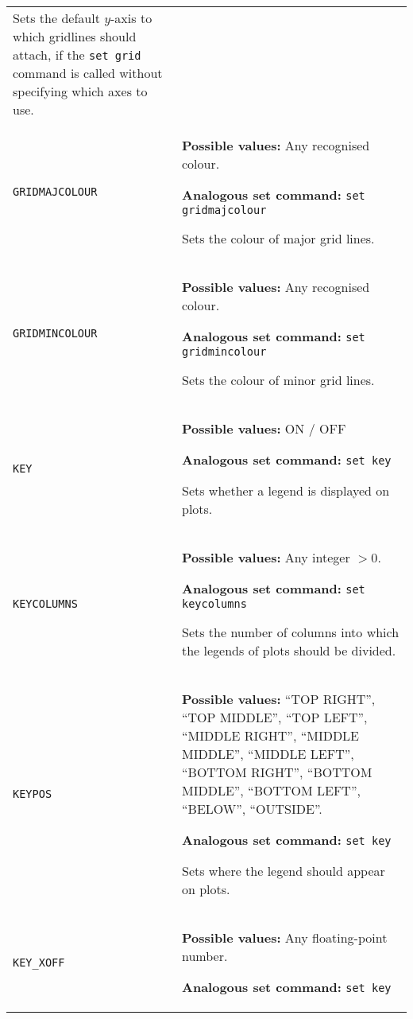 \begin{longtable}{p{3.4cm}p{9cm}}
                   Sets the default $y$-axis to which gridlines should attach, if the {\tt set grid} command is called without specifying which axes to use.
                   \\
{\tt GRIDMAJCOLOUR} & {\bf Possible values:} Any recognised colour.

                   {\bf Analogous set command:} {\tt set gridmajcolour}\index{set gridmajcolour command@{\tt set gridmajcolour} command}

                   Sets the colour of major grid lines.
                   \\
{\tt GRIDMINCOLOUR} & {\bf Possible values:} Any recognised colour.

                   {\bf Analogous set command:} {\tt set gridmincolour}\index{set gridmincolour command@{\tt set gridmincolour} command}

                   Sets the colour of minor grid lines.
                   \\
{\tt KEY} & {\bf Possible values:} ON / OFF

                   {\bf Analogous set command:} {\tt set key}\index{set key command@{\tt set key} command}

                   Sets whether a legend is displayed on plots.
                   \\
{\tt KEYCOLUMNS} & {\bf Possible values:} Any integer $>0$.

                   {\bf Analogous set command:} {\tt set keycolumns}\index{set keycolumnscommand@{\tt set keycolumns} command}

                   Sets the number of columns into which the legends of plots should be divided.
                   \\
{\tt KEYPOS} & {\bf Possible values:} ``TOP RIGHT'', ``TOP MIDDLE'', ``TOP LEFT'', ``MIDDLE RIGHT'', ``MIDDLE MIDDLE'', ``MIDDLE LEFT'', ``BOTTOM RIGHT'', ``BOTTOM MIDDLE'', ``BOTTOM LEFT'', ``BELOW'', ``OUTSIDE''.

                   {\bf Analogous set command:} {\tt set key}\index{set key command@{\tt set key} command}

                   Sets where the legend should appear on plots.
                   \\
{\tt KEY\_XOFF} & {\bf Possible values:} Any floating-point number.

                   {\bf Analogous set command:} {\tt set key}\index{set key command@{\tt set key} command}


\end{longtable}
